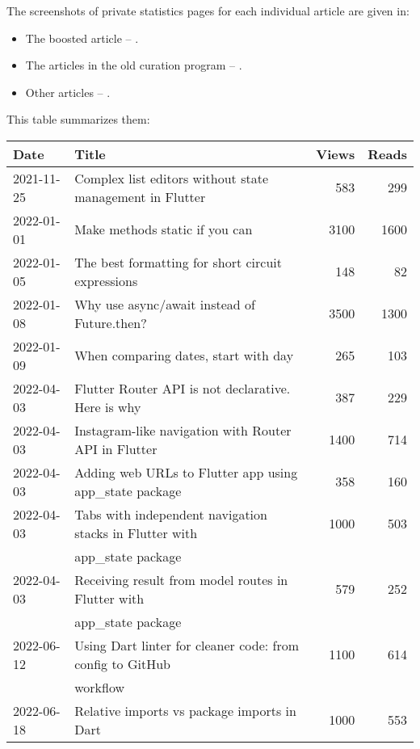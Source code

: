 
The screenshots of private statistics pages for each individual article are given in:

\begin{itemize}
    \item The boosted article -- .
    \item The articles in the old curation program -- .
    \item Other articles -- .
\end{itemize}

This table summarizes them:

\begin{longtable}{|l|l|r|r|}
    \hline
    \textbf{Date} & \textbf{Title} & \textbf{Views} & \textbf{Reads}\\
    \hline
    2021-11-25 & Complex list editors without state management in Flutter & 583 & 299\\
    2022-01-01 & Make methods static if you can & 3100 & 1600\\
    2022-01-05 & The best formatting for short circuit expressions & 148 & 82\\
    2022-01-08 & Why use async/await instead of Future.then? & 3500 & 1300\\
    2022-01-09 & When comparing dates, start with day & 265 & 103\\
    2022-04-03 & Flutter Router API is not declarative. Here is why & 387 & 229\\
    2022-04-03 & Instagram-like navigation with Router API in Flutter & 1400 & 714\\
    2022-04-03 & Adding web URLs to Flutter app using app\_state package & 358 & 160\\
    2022-04-03 & Tabs with independent navigation stacks in Flutter with & 1000 & 503\\
    & app\_state package & & \\
    2022-04-03 & Receiving result from model routes in Flutter with & 579 & 252\\
    & app\_state package & & \\
    2022-06-12 & Using Dart linter for cleaner code: from config to GitHub & 1100 & 614\\
    & workflow & & \\
    2022-06-18 & Relative imports vs package imports in Dart & 1000 & 553\\

\end{longtable}
